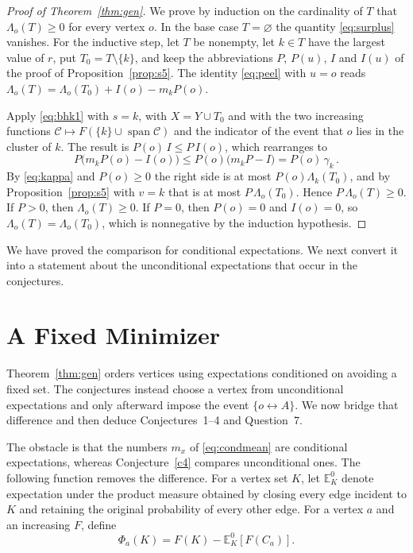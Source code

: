 \documentclass[11pt]{article}
\theoremstyle{definition}
\theoremstyle{remark}
\newcommand{\EE}{\mathbb E}
\newcommand{\con}{\leftrightarrow}
\newcommand{\eC}{\mathcal C}
\DeclareMathOperator{\spn}{span}
\begin{document}
\begin{proof}[Proof of Theorem~\ref{thm:gen}]
We prove by induction on the cardinality of $T$ that $\Lambda_o(T)\ge0$ for every vertex
$o$. In the base case $T=\varnothing$ the quantity \eqref{eq:surplus} vanishes. For the
inductive step, let $T$ be nonempty, let $k\in T$ have the largest value of $r$, put
$T_0=T\setminus\{k\}$, and keep the abbreviations $P$, $P(u)$, $I$ and $I(u)$ of the proof
of Proposition~\ref{prop:s5}. The identity \eqref{eq:peel} with $u=o$ reads
$\Lambda_o(T)=\Lambda_o(T_0)+I(o)-m_kP(o)$.

Apply \eqref{eq:bhk1} with $s=k$, with $X=Y\cup T_0$ and with the two increasing functions
$\eC\mapsto F(\{k\}\cup\spn\eC)$ and the indicator of the event that $o$ lies in the cluster
of $k$. The result is $P(o)\,I\le P\,I(o)$, which rearranges to
\[
 P\bigl(m_kP(o)-I(o)\bigr)\leq P(o)\bigl(m_kP-I\bigr)=P(o)\,\gamma_k\,.
\]
By \eqref{eq:kappa} and $P(o)\ge0$ the right side is at most $P(o)\Lambda_k(T_0)$, and by
Proposition~\ref{prop:s5} with $v=k$ that is at most $P\,\Lambda_o(T_0)$. Hence
$P\,\Lambda_o(T)\ge0$. If $P>0$, then $\Lambda_o(T)\geq0$. If $P=0$, then $P(o)=0$ and
$I(o)=0$, so $\Lambda_o(T)=\Lambda_o(T_0)$, which is nonnegative by the induction
hypothesis.
\end{proof}

We have proved the comparison for conditional expectations. We next convert it into a
statement about the unconditional expectations that occur in the conjectures.

\section{A Fixed Minimizer}\label{sec:proj}

Theorem~\ref{thm:gen} orders vertices using expectations conditioned on avoiding a fixed
set. The conjectures instead choose a vertex from unconditional expectations and only afterward impose the
event $\{o\con A\}$. We now bridge that difference and then deduce Conjectures~1--4 and
Question~7.

The obstacle is that the numbers $m_x$ of \eqref{eq:condmean} are conditional expectations,
whereas Conjecture~\ref{c4} compares unconditional ones. The following function removes the
difference. For a vertex set $K$, let $\EE_K^0$ denote expectation under the product
measure obtained by closing every edge incident to $K$ and retaining the original
probability of every other edge. For a vertex $a$ and an increasing $F$, define
\[
 \Phi_a(K)=F(K)-\EE_K^0[F(C_a)].
\]
\end{document}
